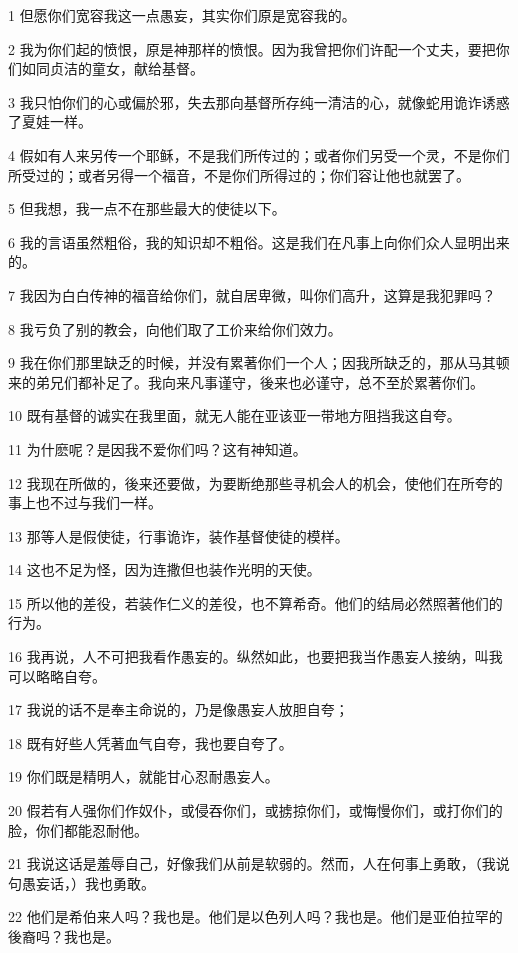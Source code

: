 \par 1 但愿你们宽容我这一点愚妄，其实你们原是宽容我的。
\par 2 我为你们起的愤恨，原是神那样的愤恨。因为我曾把你们许配一个丈夫，要把你们如同贞洁的童女，献给基督。
\par 3 我只怕你们的心或偏於邪，失去那向基督所存纯一清洁的心，就像蛇用诡诈诱惑了夏娃一样。
\par 4 假如有人来另传一个耶稣，不是我们所传过的；或者你们另受一个灵，不是你们所受过的；或者另得一个福音，不是你们所得过的；你们容让他也就罢了。
\par 5 但我想，我一点不在那些最大的使徒以下。
\par 6 我的言语虽然粗俗，我的知识却不粗俗。这是我们在凡事上向你们众人显明出来的。
\par 7 我因为白白传神的福音给你们，就自居卑微，叫你们高升，这算是我犯罪吗？
\par 8 我亏负了别的教会，向他们取了工价来给你们效力。
\par 9 我在你们那里缺乏的时候，并没有累著你们一个人；因我所缺乏的，那从马其顿来的弟兄们都补足了。我向来凡事谨守，後来也必谨守，总不至於累著你们。
\par 10 既有基督的诚实在我里面，就无人能在亚该亚一带地方阻挡我这自夸。
\par 11 为什麽呢？是因我不爱你们吗？这有神知道。
\par 12 我现在所做的，後来还要做，为要断绝那些寻机会人的机会，使他们在所夸的事上也不过与我们一样。
\par 13 那等人是假使徒，行事诡诈，装作基督使徒的模样。
\par 14 这也不足为怪，因为连撒但也装作光明的天使。
\par 15 所以他的差役，若装作仁义的差役，也不算希奇。他们的结局必然照著他们的行为。
\par 16 我再说，人不可把我看作愚妄的。纵然如此，也要把我当作愚妄人接纳，叫我可以略略自夸。
\par 17 我说的话不是奉主命说的，乃是像愚妄人放胆自夸；
\par 18 既有好些人凭著血气自夸，我也要自夸了。
\par 19 你们既是精明人，就能甘心忍耐愚妄人。
\par 20 假若有人强你们作奴仆，或侵吞你们，或掳掠你们，或悔慢你们，或打你们的脸，你们都能忍耐他。
\par 21 我说这话是羞辱自己，好像我们从前是软弱的。然而，人在何事上勇敢，（我说句愚妄话，）我也勇敢。
\par 22 他们是希伯来人吗？我也是。他们是以色列人吗？我也是。他们是亚伯拉罕的後裔吗？我也是。
